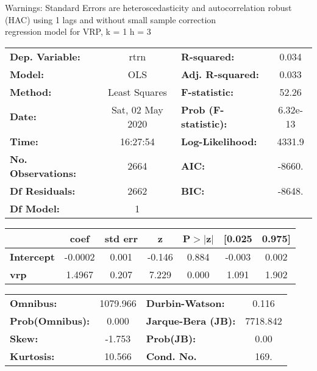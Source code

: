 Warnings: \newline
 [1] Standard Errors are heteroscedasticity and autocorrelation robust (HAC) using 1 lags and without small sample correction\\ 

regression model for VRP, k = 1 h = 3\begin{center}
\begin{tabular}{lclc}
\toprule
\textbf{Dep. Variable:}    &       rtrn       & \textbf{  R-squared:         } &     0.034   \\
\textbf{Model:}            &       OLS        & \textbf{  Adj. R-squared:    } &     0.033   \\
\textbf{Method:}           &  Least Squares   & \textbf{  F-statistic:       } &     52.26   \\
\textbf{Date:}             & Sat, 02 May 2020 & \textbf{  Prob (F-statistic):} &  6.32e-13   \\
\textbf{Time:}             &     16:27:54     & \textbf{  Log-Likelihood:    } &    4331.9   \\
\textbf{No. Observations:} &        2664      & \textbf{  AIC:               } &    -8660.   \\
\textbf{Df Residuals:}     &        2662      & \textbf{  BIC:               } &    -8648.   \\
\textbf{Df Model:}         &           1      & \textbf{                     } &             \\
\bottomrule
\end{tabular}
\begin{tabular}{lcccccc}
                   & \textbf{coef} & \textbf{std err} & \textbf{z} & \textbf{P$> |$z$|$} & \textbf{[0.025} & \textbf{0.975]}  \\
\midrule
\textbf{Intercept} &      -0.0002  &        0.001     &    -0.146  &         0.884        &       -0.003    &        0.002     \\
\textbf{vrp}       &       1.4967  &        0.207     &     7.229  &         0.000        &        1.091    &        1.902     \\
\bottomrule
\end{tabular}
\begin{tabular}{lclc}
\textbf{Omnibus:}       & 1079.966 & \textbf{  Durbin-Watson:     } &    0.116  \\
\textbf{Prob(Omnibus):} &   0.000  & \textbf{  Jarque-Bera (JB):  } & 7718.842  \\
\textbf{Skew:}          &  -1.753  & \textbf{  Prob(JB):          } &     0.00  \\
\textbf{Kurtosis:}      &  10.566  & \textbf{  Cond. No.          } &     169.  \\
\bottomrule
\end{tabular}
\end{center}

